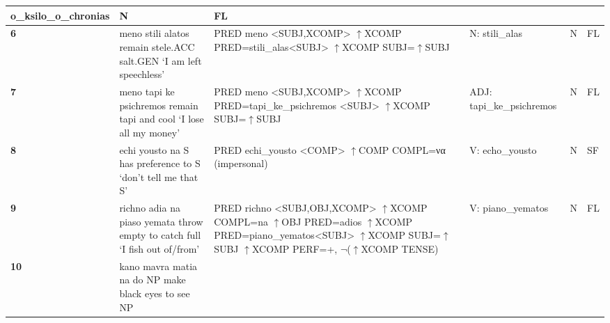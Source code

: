 \begin{table}[p]
{\begin{tabular}{|l|p{5.6cm}|p{6.4cm}|p{3.3cm}|l|l|}
o\_ksilo\_o\_chronias
  &
N
  &
FL
\\
  \hline
  \textbf{6}
  &
meno stili alatos \newline
remain stele.ACC salt.GEN \newline
`I am left speechless’
  &
PRED meno <SUBJ,XCOMP> \newline
$\uparrow$XCOMP PRED=stili\_alas<SUBJ> \newline
$\uparrow$XCOMP SUBJ=$\uparrow$SUBJ
  &
N: \newline
stili\_alas
  &
N
  &
FL
  \\
  \hline
  \textbf{7}
  &
meno tapi ke psichremos \newline
remain tapi and cool \newline
`I lose all my money’
  &
PRED meno <SUBJ,XCOMP> \newline
$\uparrow$XCOMP PRED=tapi\_ke\_psichremos \newline
<SUBJ> \newline
$\uparrow$XCOMP SUBJ=$\uparrow$SUBJ
  &
ADJ: \newline
tapi\_ke\_psichremos
  &
N
  &
FL
  \\
  \hline
  \textbf{8}
  &
echi yousto na S \newline
has preference to S \newline
`don’t tell me that S’
  &
PRED echi\_yousto <COMP> \newline
$\uparrow$COMP COMPL=να \newline
(impersonal)
  &
V: \newline
echo\_yousto
  &
N
  &
SF
  \\
  \hline
  \textbf{9}
  &
richno adia na piaso yemata \newline
throw empty to catch full \newline
`I fish out of/from’
  &
PRED richno <SUBJ,OBJ,XCOMP> \newline
$\uparrow$XCOMP COMPL=na \newline
$\uparrow$OBJ PRED=adios \newline
$\uparrow$XCOMP PRED=piano\_yematos<SUBJ> \newline
$\uparrow$XCOMP SUBJ=$\uparrow$SUBJ \newline
$\uparrow$XCOMP PERF=+, $\neg$($\uparrow$XCOMP TENSE) 
  &
V: \newline
piano\_yematos
  &
N
  &
FL
  \\
  \hline
  \textbf{10}
  &
kano mavra matia na do NP \newline
make black eyes to see NP \newline

\end{tabular}}
\end{table}
